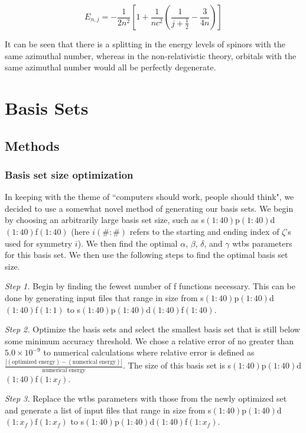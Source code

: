 \documentclass[12pt]{report}
\begin{document}
\begin{equation}
\label{eq:dirac_energy}
E_{n, j} = -\frac{1}{2n^{2}}\left[1+\frac{1}{nc^{2}}\left(\frac{1}{j+\frac{1}{2}}-\frac{3}{4n}\right)\right]
\end{equation}

It can be seen that there is a splitting in the energy levels of spinors with the same azimuthal number, whereas in the non-relativistic theory, orbitals with the same azimuthal number would all be perfectly degenerate.

\chapter{Basis Sets}
\label{chap:basis_sets}
\section{Methods}
\subsection{Basis set size optimization}
In keeping with the theme of ``computers should work, people should think", we decided to use a somewhat novel method of generating our basis sets. We begin by choosing an arbitrarily large basis set size, such as s$(1:40)$p$(1:40)$d$(1:40)$f$(1:40)$ (here $i(\#:\#)$ refers to the starting and ending index of $\zeta$'s used for symmetry $i$). We then find the optimal $\alpha$, $\beta$, $\delta$, and $\gamma$ wtbs parameters for this basis set. We then use the following steps to find the optimal basis set size.

\textit{Step 1.} Begin by finding the fewest number of f functions necessary. This can be done by generating input files that range in size from s$(1:40)$p$(1:40)$d$(1:40)$f$(1:1)$ to s$(1:40)$p$(1:40)$d$(1:40)$f$(1:40)$.

\textit{Step 2.} Optimize the basis sets and select the smallest basis set that is still below some minimum accuracy threshold. We chose a relative error of no greater than $5.0\times10^{-9}$ to numerical calculations where relative error is defined as $\frac{|(\text{optimized energy}) - (\text{numerical energy})|}{\text{numerical energy}}$. The size of this basis set is s$(1:40)$p$(1:40)$d$(1:40)$f$(1:x_{f})$.

\textit{Step 3.} Replace the wtbs parameters with those from the newly optimized set and generate a list of input files that range in size from s$(1:40)$p$(1:40)$d$(1:x_{f})$f$(1:x_{f})$ to s$(1:40)$p$(1:40)$d$(1:40)$f$(1:x_{f})$.
\end{document}
